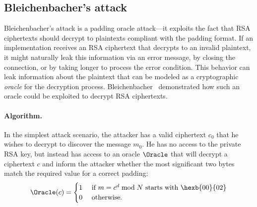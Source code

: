 \subsection{Bleichenbacher's attack}
\label{sec:bleichenbacher}
Bleichenbacher's attack is a padding oracle attack---it exploits the
fact that RSA ciphertexts should decrypt to plaintexts compliant with
the \PKCS padding format. If an implementation receives an RSA
ciphertext that decrypts to an invalid \PKCS plaintext, it might
naturally leak this information via an error message, by closing the
connection, or by taking longer to process the error condition.  This
behavior can leak information about the plaintext that can be modeled
as a cryptographic \textit{oracle} for the decryption
process. Bleichenbacher~\cite{Bleichenbacher} demonstrated how such an
oracle could be exploited to decrypt RSA ciphertexts.


\paragraph{Algorithm.}
In the simplest attack scenario, the attacker has a valid \PKCS
ciphertext $c_{0}$ that he wishes to decrypt to discover the message
$m_{0}$.  He has no access to the private RSA key, but instead has
access to an oracle $\Oracle$ that will decrypt a ciphertext $c$ and
inform the attacker whether the most significant two bytes match
the required value for a correct \PKCS padding:
\begin{equation*} 
\Oracle(c) =  
\begin{cases} 
1 & \text{ if } m=c^d \bmod N \text{ starts with \hexb{00}{02}} \\ 
0 & \text{ otherwise.} 
\end{cases} 
\end{equation*} 

